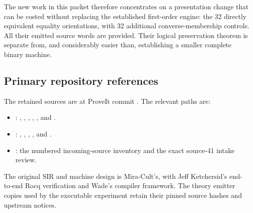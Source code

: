 The new work in this packet therefore concentrates on a presentation
change that can be costed without replacing the established
first-order engine: the 32 directly equivalent equality orientations,
with 32 additional converse-membership controls.  All their emitted
source words are provided.  Their logical preservation theorem is
separate from, and considerably easier than, establishing a smaller
complete binary machine.

\subsection{Primary repository references}

The retained sources are at ProveIt commit
.  The relevant
paths are:
\begin{itemize}
\item {}:
, ,
, ,
, and .
\item {}:
, ,
,
, and .
\item {}
: the numbered incoming-source
inventory and the exact source-41 intake review.
\end{itemize}
The original SIR and machine design is Mira-Cult's, with Jeff
Ketchersid's end-to-end Rocq verification and Wade's compiler
framework.  The theory emitter copies used by the executable
experiment retain their pinned source hashes and upstream notices.
